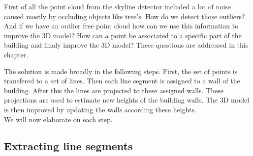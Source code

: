 \documentclass[10pt]{article}
\begin{document}
First of all the point cloud from the skyline detector included a lot of noise caused mostly
by occluding objects like tree's. How do we detect those outliers?
And if we have an outlier free point cloud how can we use this information to
improve the 3D model? How can a point be associated to a specific part of the
building and finaly improve the 3D model? 
These questions are addressed in this chapter.

The solution is made broadly in the following steps. First, the set of points is transfered to a set of
lines. Then each line segment is assigned to a wall of the building. After this 
the lines are projected to these assigned walls. 
These projections are used to estimate new heights of the building walls.
The 3D model is then improved by updating the walls according these heights. \\
 We will now elaborate on each step.





\subsection{Extracting line segments}

%
\end{document}
